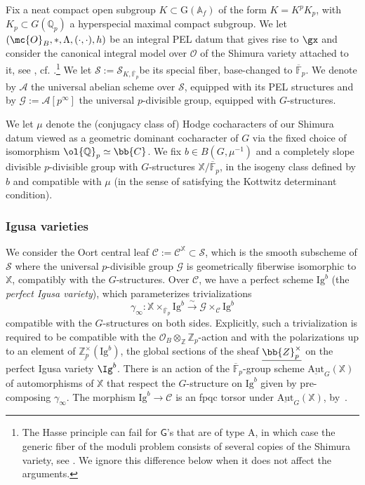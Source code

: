 \documentclass[letterpaper,11pt]{amsart}
\begin{document}
Fix a neat compact open subgroup $K\subset \mathrm{G}(\mathbb{A}_f)$ of the form $K = K^pK_p$, with $K_p\subset G(\mathbb{Q}_p)$ a hyperspecial maximal compact subgroup. We let $(\mc{O}_B,\ast,\Lambda,(\cdot,\cdot),h)$ be an integral PEL datum that gives rise to $\gx$ and consider the canonical integral model over $\mathcal{O}$ of the Shimura variety attached to it, see \cite{Kottwitz}, cf. \cite[Definition 5.9]{zhang2023}.\footnote{The Hasse principle can fail for $\mathsf{G}$'s that are of type A, in which case the generic fiber of the moduli problem consists of several copies of the Shimura variety, see \cite[Remark 5.7]{zhang2023}. We ignore this difference below when it does not affect the arguments.} We let $\mathscr{S}:=\mathscr{S}_{K, \overline{\mathbb{F}}_p}$be its special fiber, base-changed to $\overline{\mathbb{F}}_p$. We denote by $\mathcal{A}$ the universal abelian scheme over $\mathscr{S}$, equipped with its PEL structures and by $\mathscr{G}:=\mathcal{A}[p^\infty]$ the universal $p$-divisible group, equipped with $G$-structures. 

We let $\mu$ denote the (conjugacy class of) Hodge cocharacters of our Shimura datum viewed as a geometric dominant cocharacter of $G$ via the fixed choice of isomorphism $\ol{\mathbb{Q}}_{p} \simeq \bb{C}$. We fix $b\in B(G,\mu^{-1})$ and a completely slope divisible $p$-divisible group with $G$-structures $\mathbb{X}/\overline{\mathbb{F}}_p$, in the isogeny class defined by $b$ and compatible with $\mu$ (in the sense of satisfying the Kottwitz determinant condition). 

\subsubsection{Igusa varieties}{\label{ss: IgusaVarieties}} We consider the Oort central leaf $\mathscr{C}:=\mathscr{C}^{\mathbb{X}}\subset \mathscr{S}$, which is the smooth subscheme of $\mathscr{S}$ where the universal $p$-divisible group $\mathscr{G}$ is geometrically fiberwise isomorphic to $\mathbb{X}$, compatibly with the $G$-structures. Over $\mathscr{C}$, we have a perfect scheme $\mathrm{Ig}^b$ (the \emph{perfect Igusa variety}), which parameterizes trivializations 
\[
\gamma_\infty:
\mathbb{X}\times_{\overline{\mathbb{F}}_p} \mathrm{Ig}^b
\stackrel{\sim}{\to}
\mathscr{G}\times_{\mathscr{C}}\mathrm{Ig}^b 
\]
compatible with the $G$-structures on both sides. 
Explicitly, such a trivialization is required to be compatible with the $\mathcal{O}_B\otimes_{\mathbb{Z}}\mathbb{Z}_p$-action and with the polarizations up to an element of $\underline{\mathbb{Z}_p^\times} (\mathrm{Ig}^b)$, the global sections of the sheaf $\underline{\bb{Z}_{p}^\times}$ on the perfect Igusa variety $\Ig^{b}$. There is an action of the $\overline{\mathbb{F}}_p$-group scheme $\underline{\mathrm{Aut}}_{G}(\mathbb{X})$ of automorphisms of $\mathbb{X}$ that respect the $G$-structure on $\mathrm{Ig}^b$ given by pre-composing $\gamma_\infty$. The morphism $\mathrm{Ig}^b\to \mathscr{C}$ is an fpqc torsor under $\underline{\mathrm{Aut}}_{G}(\mathbb{X})$, by~\cite[Corollary 2.3.2]{CS2}.  
\end{document}

